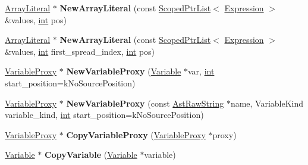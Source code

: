 \begin{DoxyCompactItemize}
\mbox{\hyperlink{classv8_1_1internal_1_1ArrayLiteral}{Array\+Literal}} $\ast$ {\bfseries New\+Array\+Literal} (const \mbox{\hyperlink{classv8_1_1internal_1_1ScopedPtrList}{Scoped\+Ptr\+List}}$<$ \mbox{\hyperlink{classv8_1_1internal_1_1Expression}{Expression}} $>$ \&values, \mbox{\hyperlink{classint}{int}} pos)
\item 
\mbox{\label{classv8_1_1internal_1_1AstNodeFactory_a78bdd8af6714df1ed726a3b8f119ba3c}} 
\mbox{\hyperlink{classv8_1_1internal_1_1ArrayLiteral}{Array\+Literal}} $\ast$ {\bfseries New\+Array\+Literal} (const \mbox{\hyperlink{classv8_1_1internal_1_1ScopedPtrList}{Scoped\+Ptr\+List}}$<$ \mbox{\hyperlink{classv8_1_1internal_1_1Expression}{Expression}} $>$ \&values, \mbox{\hyperlink{classint}{int}} first\+\_\+spread\+\_\+index, \mbox{\hyperlink{classint}{int}} pos)
\item 
\mbox{\label{classv8_1_1internal_1_1AstNodeFactory_a6e25cceb0ac6f7c71a93f08e74eb0ff5}} 
\mbox{\hyperlink{classv8_1_1internal_1_1VariableProxy}{Variable\+Proxy}} $\ast$ {\bfseries New\+Variable\+Proxy} (\mbox{\hyperlink{classv8_1_1internal_1_1Variable}{Variable}} $\ast$var, \mbox{\hyperlink{classint}{int}} start\+\_\+position=k\+No\+Source\+Position)
\item 
\mbox{\label{classv8_1_1internal_1_1AstNodeFactory_a9d23de12a7d834ae32cf2849d8525fa2}} 
\mbox{\hyperlink{classv8_1_1internal_1_1VariableProxy}{Variable\+Proxy}} $\ast$ {\bfseries New\+Variable\+Proxy} (const \mbox{\hyperlink{classv8_1_1internal_1_1AstRawString}{Ast\+Raw\+String}} $\ast$name, Variable\+Kind variable\+\_\+kind, \mbox{\hyperlink{classint}{int}} start\+\_\+position=k\+No\+Source\+Position)
\item 
\mbox{\label{classv8_1_1internal_1_1AstNodeFactory_a2ca4d362b560c7cfeecef80bf5ef84b9}} 
\mbox{\hyperlink{classv8_1_1internal_1_1VariableProxy}{Variable\+Proxy}} $\ast$ {\bfseries Copy\+Variable\+Proxy} (\mbox{\hyperlink{classv8_1_1internal_1_1VariableProxy}{Variable\+Proxy}} $\ast$proxy)
\item 
\mbox{\label{classv8_1_1internal_1_1AstNodeFactory_a7ce8d9ced2df56e719f1e43bbe8a73fc}} 
\mbox{\hyperlink{classv8_1_1internal_1_1Variable}{Variable}} $\ast$ {\bfseries Copy\+Variable} (\mbox{\hyperlink{classv8_1_1internal_1_1Variable}{Variable}} $\ast$variable)

\end{DoxyCompactItemize}
